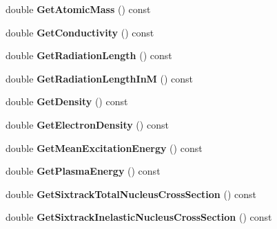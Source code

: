 \begin{DoxyCompactItemize}
\item 
\mbox{\label{classCompositeMaterial_a569c8070e0a7df2d13e19ebf6b3c1310}} 
double {\bfseries Get\+Atomic\+Mass} () const
\item 
\mbox{\label{classCompositeMaterial_a94f891493c118a7168906a665cdc4820}} 
double {\bfseries Get\+Conductivity} () const
\item 
\mbox{\label{classCompositeMaterial_a75038d643406370fb57e2b4d718fbc24}} 
double {\bfseries Get\+Radiation\+Length} () const
\item 
\mbox{\label{classCompositeMaterial_af6662ed3ee081a64f87d0c2de80cd621}} 
double {\bfseries Get\+Radiation\+Length\+InM} () const
\item 
\mbox{\label{classCompositeMaterial_a666adf4b2976890c87dc9f750a9d82ed}} 
double {\bfseries Get\+Density} () const
\item 
\mbox{\label{classCompositeMaterial_a7c29bdfc7d50f9b35edcfcd78466ac5c}} 
double {\bfseries Get\+Electron\+Density} () const
\item 
\mbox{\label{classCompositeMaterial_ae6b0125c73e34217daf343a382d436b9}} 
double {\bfseries Get\+Mean\+Excitation\+Energy} () const
\item 
\mbox{\label{classCompositeMaterial_a657c72b582b8cd47f2d543f62efdc077}} 
double {\bfseries Get\+Plasma\+Energy} () const
\item 
\mbox{\label{classCompositeMaterial_a02b8233ff4fd1317dbbca3e34dac2cac}} 
double {\bfseries Get\+Sixtrack\+Total\+Nucleus\+Cross\+Section} () const
\item 
\mbox{\label{classCompositeMaterial_a290910e39c9b00605c148af0c2db53eb}} 
double {\bfseries Get\+Sixtrack\+Inelastic\+Nucleus\+Cross\+Section} () const
\item 
\mbox{\label{classCompositeMaterial_ae8fdb12824bc47c073c53fe88ff6fa39}} 

\end{DoxyCompactItemize}
